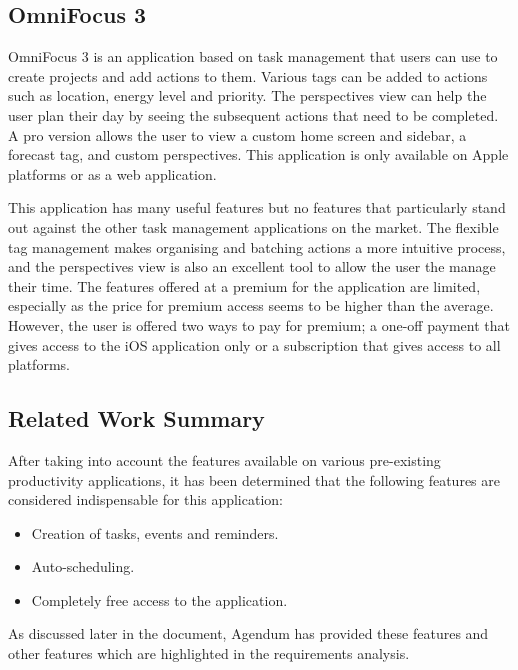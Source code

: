	        \subsection{OmniFocus 3}
	        
	        OmniFocus 3\cite{OmniFocus} is an application based on task management that users can use to create projects and add actions to them.  Various tags can be added to actions such as location, energy level and priority.  The perspectives view can help the user plan their day by seeing the subsequent actions that need to be completed.  A pro version allows the user to view a custom home screen and sidebar, a forecast tag, and custom perspectives.  This application is only available on Apple platforms or as a web application.
	        
	        
	        
	        This application has many useful features but no features that particularly stand out against the other task management applications on the market.  The flexible tag management makes organising and batching actions a more intuitive process, and the perspectives view is also an excellent tool to allow the user the manage their time.  The features offered at a premium for the application are limited, especially as the price for premium access seems to be higher than the average. However, the user is offered two ways to pay for premium; a one-off payment that gives access to the iOS application only or a subscription that gives access to all platforms.
	        
	        \subsection{Related Work Summary}
	        
	        After taking into account the features available on various pre-existing productivity applications, it has been determined that the following features are considered indispensable for this application:
	        \begin{itemize}[noitemsep]
	            \item Creation of tasks, events and reminders.
	            \item Auto-scheduling.
	            \item Completely free access to the application.
	        \end{itemize}
	        
	        As discussed later in the document, Agendum has provided these features and other features which are highlighted in the requirements analysis.